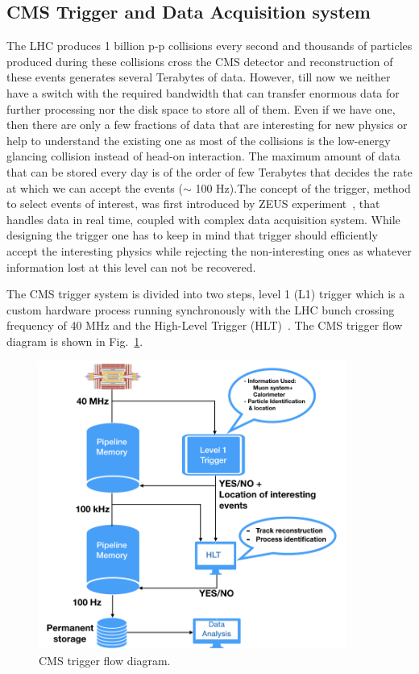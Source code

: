 \subsection{CMS Trigger and Data Acquisition system} %
\label{sub:cms_trigger_and_data_acquisition_system}
The LHC produces 1 billion p-p collisions every second and thousands of particles produced during these collisions cross the CMS detector and reconstruction of these events generates several Terabytes of data. However, till now we neither have a switch with the required bandwidth that can transfer enormous data for further processing nor the disk space to store all of them. Even if we have one, then there are only a few fractions of data that are interesting for new physics or help to understand the existing one as most of the collisions is the low-energy glancing collision instead of head-on interaction. The maximum amount of data that can be stored every day is of the order of few Terabytes that decides the rate at which we can accept the events ($\sim$ 100 Hz).The concept of the trigger, method to select events of interest, was first introduced by ZEUS experiment~\cite{ZEUSCollaboration1993}, that handles data in real time, coupled with complex data acquisition system. While designing the trigger one has to keep in mind that trigger should efficiently accept the interesting physics while rejecting the non-interesting ones as whatever information lost at this level can not be recovered.


The CMS trigger system is divided into two steps, level 1 (L1) trigger which is a custom hardware process running synchronously with the LHC bunch crossing frequency of 40 MHz and the High-Level Trigger (HLT)~\cite{paper:JINST:CMSCollaboration,Cittolin:578006,Khachatryan2017}. The CMS trigger flow diagram is shown in Fig.~\ref{fig:cms-trigger}. 
\begin{figure}[!htbp]
	\centering
	\includegraphics[width=0.90\textwidth,height=0.63\textwidth]{figures/LHC/Trigger-flow-diagram.jpeg}
	\caption{CMS trigger flow diagram.}
	\label{fig:cms-trigger}
\end{figure}

